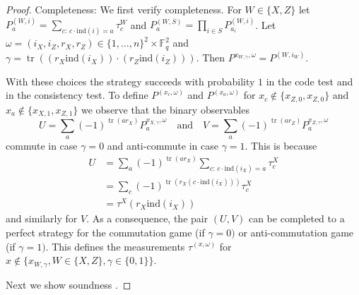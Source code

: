 \documentclass[11pt]{article}
\theoremstyle{definition}
\newcommand{\F}{\ensuremath{\mathbb{F}}}
\newcommand{\ind}{\ensuremath{\mathrm{ind}}}
\DeclareMathOperator{\tr}{tr}
\begin{document}
\begin{proof}
Completeness: We first verify completeness. For $W\in\{X,Z\}$ let $P^{(W,i)}_a = \sum_{c:\,c\cdot\ind(i)=a} \tau^W_{c}$ and $P^{(W,S)}_a = \prod_{i\in S} P^{(W,i)}_{a_i}$. Let $\omega=(i_X,i_Z,r_X,r_Z)\in \{1,\ldots,n\}^2 \times \F_q^2$ and $\gamma = \tr( (r_X\ind(i_X))\cdot  (r_Z \ind(i_Z)))$. Then $P^{x_{W,\gamma},\omega} = P^{(W,i_W)}$. 

With these choices the strategy succeeds with probability $1$ in the code test and in the consistency test. To define $P^{(x_c,\omega)}$ and $P^{(x_a,\omega)}$ for $x_c\notin \{x_{Z,0},x_{Z,0}\}$ and $x_a \notin \{x_{X,1},x_{Z,1}\}$ we observe that the binary observables 
\[ U = \sum_a (-1)^{\tr(ar_X)} P^{x_{X,\gamma},\omega}_a\quad\text{and}\quad V= \sum_a (-1)^{\tr(a r_Z)} P^{x_{Z,\gamma},\omega}_a \]
commute in case $\gamma=0$ and anti-commute in case $\gamma=1$. This is because 
\begin{align*}
U &=  \sum_a (-1)^{\tr(ar_X)} \sum_{c:\,c\cdot\ind(i_X)=a} \tau^X_{c}\\
&= \sum_c (-1)^{\tr(r_X (c\cdot\ind(i_X)))} \tau^X_{c}\\
&= \tau^X(r_X\ind(i_X))
\end{align*}
and similarly for $V$. As a consequence, the pair $(U,V)$ can be completed to a perfect strategy for the commutation game (if $\gamma=0)$ or anti-commutation game (if $\gamma=1)$. This defines the measurements $\tau^{(x,\omega)}$ for $x\notin \{x_{W,\gamma},W\in\{X,Z\},\gamma\in\{0,1\}\}$. 

Next we show soundness . 
\end{proof}




\notesendofpaper
\end{document}
